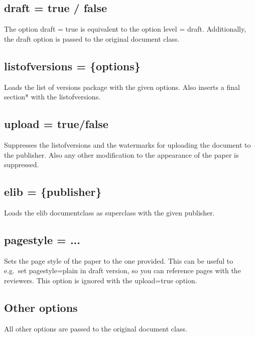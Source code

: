 \documentclass[style=article,draft]{dlrpaper}
\begin{document}
\subsection{draft = true / false}
The option draft = true is equivalent to the option level = draft. Additionally, the draft option is passed to the original document class.

\subsection{listofversions = \{options\}}
Loads the list of versions package with the given options. Also inserts a final section* with the listofversions.

\subsection{upload = true/false}
Suppresses the listofversions and the watermarks for uploading the document to the publisher. Also any other modification to the appearance of the paper is suppressed.

\subsection{elib = \{publisher\}}
Loads the elib documentclass as superclass with the given publisher.

\subsection{pagestyle = ...}
Sets the page style of the paper to the one provided. This can be useful to e.g.\ set pagestyle=plain in draft version, so you can reference pages with the reviewers. This option is ignored with the upload=true option.

\subsection{Other options}
All other options are passed to the original document class.
\end{document}
